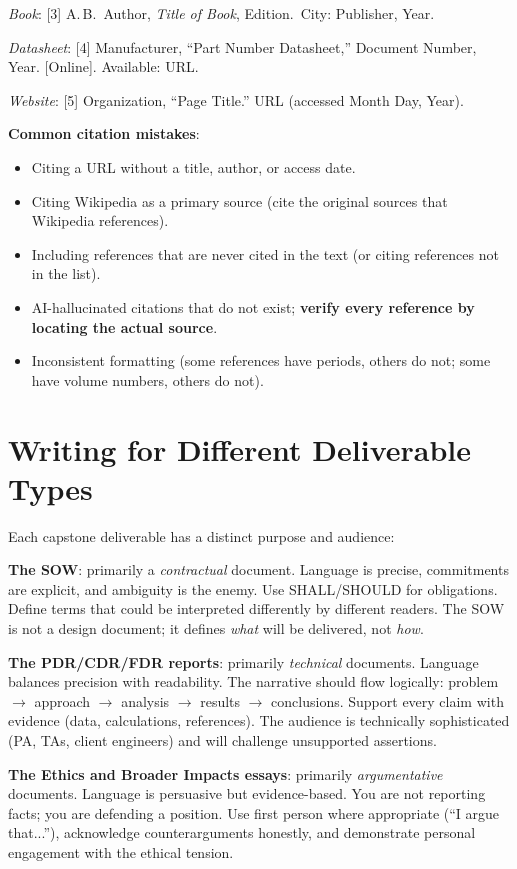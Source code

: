 \textit{Book}: [3] A.\,B.\ Author, \textit{Title of Book}, Edition.\ City: Publisher, Year.

\textit{Datasheet}: [4] Manufacturer, ``Part Number Datasheet,'' Document Number, Year. [Online]. Available: URL.

\textit{Website}: [5] Organization, ``Page Title.'' URL (accessed Month Day, Year).

\textbf{Common citation mistakes}:
\begin{itemize}[nosep,leftmargin=1.5em]
\item Citing a URL without a title, author, or access date.
\item Citing Wikipedia as a primary source (cite the original sources that Wikipedia references).
\item Including references that are never cited in the text (or citing references not in the list).
\item AI-hallucinated citations that do not exist; \textbf{verify every reference by locating the actual source}.
\item Inconsistent formatting (some references have periods, others do not; some have volume numbers, others do not).
\end{itemize}



\section{Writing for Different Deliverable Types}
Each capstone deliverable has a distinct purpose and audience:

\textbf{The SOW}: primarily a \emph{contractual} document. Language is precise, commitments are explicit, and ambiguity is the enemy. Use SHALL/SHOULD for obligations. Define terms that could be interpreted differently by different readers. The SOW is not a design document; it defines \emph{what} will be delivered, not \emph{how}.

\textbf{The PDR/CDR/FDR reports}: primarily \emph{technical} documents. Language balances precision with readability. The narrative should flow logically: problem $\to$ approach $\to$ analysis $\to$ results $\to$ conclusions. Support every claim with evidence (data, calculations, references). The audience is technically sophisticated (PA, TAs, client engineers) and will challenge unsupported assertions.

\textbf{The Ethics and Broader Impacts essays}: primarily \emph{argumentative} documents. Language is persuasive but evidence-based. You are not reporting facts; you are defending a position. Use first person where appropriate (``I argue that...''), acknowledge counterarguments honestly, and demonstrate personal engagement with the ethical tension.

